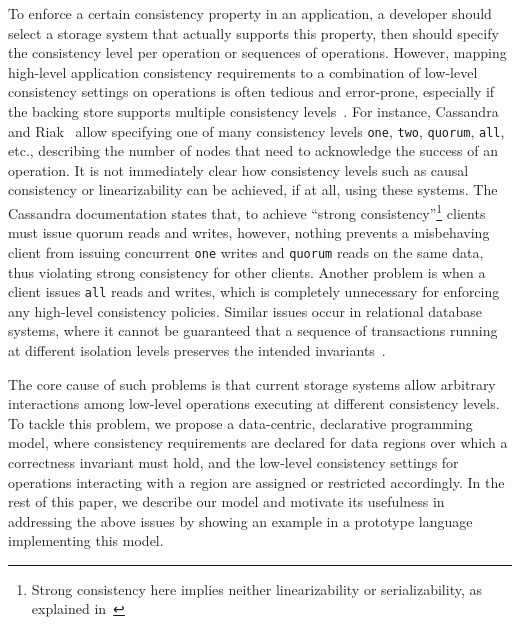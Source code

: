 \documentclass[preprint,numbers]{sigplanconf}
\begin{document}
To enforce a certain consistency
property in an application, a developer should select a storage system that
actually supports this property, then should specify the consistency level per
operation or
sequences of operations. However, mapping high-level application consistency requirements to a combination of
low-level consistency settings on operations is often tedious and error-prone, especially if
the backing store supports multiple consistency levels~\cite{???}.
For instance,
Cassandra~\cite{lakshman2010cassandra} and Riak~\cite{???} allow specifying one of many
consistency levels
\texttt{one}, \texttt{two}, \texttt{quorum}, \texttt{all}, etc., describing the number of nodes that need to
acknowledge the success of an operation. It
is not immediately clear how consistency levels such as causal consistency or
linearizability can be achieved, if at all, using these systems.  The Cassandra documentation
states that,
to achieve ``strong consistency''\footnote{Strong consistency here implies
neither linearizability or serializability, as explained in~\cite{sivaramakrishnan2016representation}} clients must issue quorum reads and writes,
however, nothing prevents a misbehaving client from issuing concurrent \texttt{one} writes and
\texttt{quorum} reads on the same data, thus violating strong consistency for other clients. Another
problem is when a client issues \texttt{all} reads and writes, which is completely
unnecessary for enforcing any high-level consistency policies. Similar issues
occur in relational database systems, where it cannot be guaranteed that a
sequence of transactions running at different isolation levels preserves the intended
invariants~\cite{gray1992transaction}. 


The core cause of such problems is that current storage systems allow arbitrary
interactions among low-level operations executing at different consistency levels. To
tackle this problem, we propose a data-centric, declarative programming model, where
consistency requirements are declared for data regions over which a correctness
invariant must hold, and the low-level consistency settings for operations interacting with
a region are assigned or restricted accordingly. In the rest of this paper, we describe our
model and motivate its usefulness in addressing the above issues by showing
an example in a prototype language implementing this model.
\end{document}
